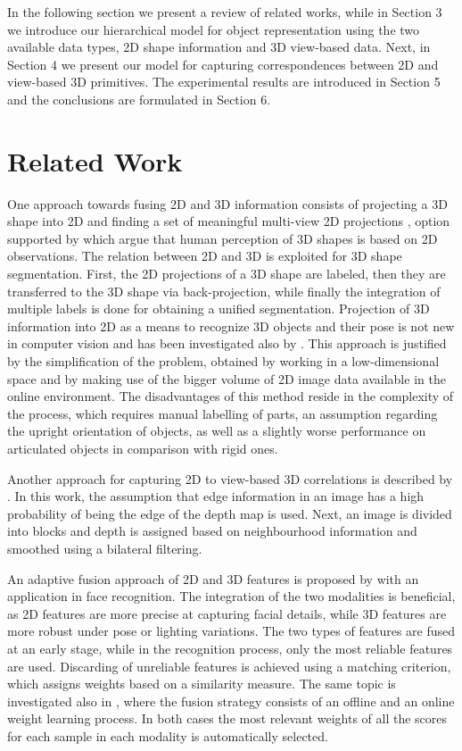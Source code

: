 \documentclass[runningheads]{llncs}
\begin{document}
In the following section we present a review of related works, while in Section 3 we introduce our hierarchical model for object representation using the two available data types, 2D shape information and 3D view-based data. Next, in Section 4 we present our model for capturing correspondences between 2D and view-based 3D primitives. The experimental results are introduced in Section 5 and the conclusions are formulated in Section 6.

\section{Related Work}
\label{sec:related_work}  

One approach towards fusing 2D and 3D information consists of projecting a 3D shape into 2D and finding a set of meaningful multi-view 2D projections \cite{WangGWC0C13}, option supported by \cite{Fleming2009} which argue that human perception of 3D shapes is based on 2D observations. The relation between 2D and 3D is exploited for 3D shape segmentation. First, the 2D projections of a 3D shape are labeled, then they are transferred to the 3D shape via back-projection, while finally the integration of multiple labels is done for obtaining a unified segmentation. Projection of 3D information into 2D as a means to recognize 3D objects and their pose is not new in computer vision and has been investigated also by \cite{Cyr2001}. This approach is justified by the simplification of the problem, obtained by working in a low-dimensional space and by making use of the bigger volume of 2D image data available in the online environment. The disadvantages of this method reside in the complexity of the process, which requires manual labelling of parts, an assumption regarding the upright orientation of objects, as well as a slightly worse performance on articulated objects in comparison with rigid ones.

Another approach for capturing 2D to view-based 3D correlations is described by \cite{Cheng2010}. In this work, the assumption that edge information in an image has a high probability of being the edge of the depth map is used. Next, an image is divided into blocks and depth is assigned based on neighbourhood information and smoothed using a bilateral filtering. 

An adaptive fusion approach of 2D and 3D features is proposed by \cite{Arca2007} with an application in face recognition. The integration of the two modalities is beneficial, as 2D features are more precise at capturing facial details, while 3D features are more robust under pose or lighting variations. The two types of features are fused at an early stage, while in the recognition process, only the most reliable features are used. Discarding of unreliable features is achieved using a matching criterion, which assigns weights based on a similarity measure. The same topic is investigated also in \cite{Soltana2010}, where the fusion strategy consists of an offline and an online weight learning process. In both cases the most relevant weights of all the scores for each sample in each modality is automatically selected.
\end{document}
